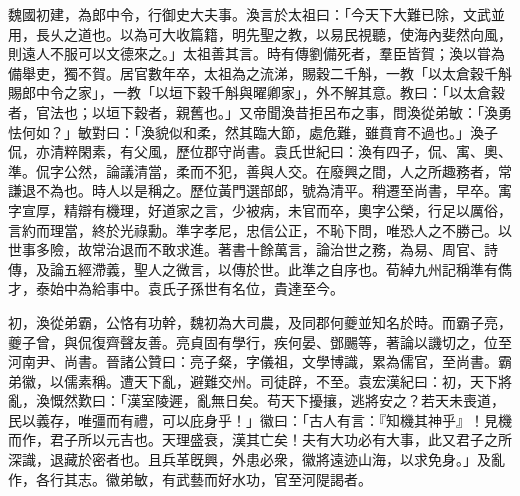 \begin{pinyinscope}
魏國初建，為郎中令，行御史大夫事。渙言於太祖曰：「今天下大難已除，文武並用，長乆之道也。以為可大收篇籍，明先聖之教，以易民視聽，使海內斐然向風，則遠人不服可以文德來之。」太祖善其言。時有傳劉備死者，羣臣皆賀；渙以甞為備舉吏，獨不賀。居官數年卒，太祖為之流涕，賜穀二千斛，一教「以太倉穀千斛賜郎中令之家」，一教「以垣下穀千斛與曜卿家」，外不解其意。教曰：「以太倉穀者，官法也；以垣下穀者，親舊也。」又帝聞渙昔拒呂布之事，問渙從弟敏：「渙勇怯何如？」敏對曰：「渙貌似和柔，然其臨大節，處危難，雖賁育不過也。」渙子侃，亦清粹閑素，有父風，歷位郡守尚書。袁氏世紀曰：渙有四子，侃、㝢、奧、準。侃字公然，論議清當，柔而不犯，善與人交。在廢興之間，人之所趣務者，常謙退不為也。時人以是稱之。歷位黃門選部郎，號為清平。稍遷至尚書，早卒。㝢字宣厚，精辯有機理，好道家之言，少被病，未官而卒，奧字公榮，行足以厲俗，言約而理當，終於光祿勳。準字孝尼，忠信公正，不恥下問，唯恐人之不勝己。以世事多險，故常治退而不敢求進。著書十餘萬言，論治世之務，為易、周官、詩傳，及論五經滯義，聖人之微言，以傳於世。此準之自序也。荀綽九州記稱準有儁才，泰始中為給事中。袁氏子孫世有名位，貴達至今。

初，渙從弟霸，公恪有功幹，魏初為大司農，及同郡何夔並知名於時。而霸子亮，夔子曾，與侃復齊聲友善。亮貞固有學行，疾何晏、鄧颺等，著論以譏切之，位至河南尹、尚書。晉諸公贊曰：亮子粲，字儀祖，文學博識，累為儒官，至尚書。霸弟徽，以儒素稱。遭天下亂，避難交州。司徒辟，不至。袁宏漢紀曰：初，天下將亂，渙慨然歎曰：「漢室陵遲，亂無日矣。苟天下擾攘，逃將安之？若天未喪道，民以義存，唯彊而有禮，可以庇身乎！」徽曰：「古人有言：『知機其神乎』！見機而作，君子所以元吉也。天理盛衰，漢其亡矣！夫有大功必有大事，此又君子之所深識，退藏於密者也。且兵革旣興，外患必衆，徽將遠迹山海，以求免身。」及亂作，各行其志。徽弟敏，有武藝而好水功，官至河隄謁者。


\end{pinyinscope}